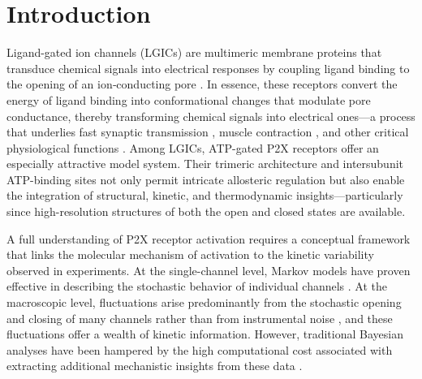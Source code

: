 \documentclass[pdflatex,sn-nature]{sn-jnl}%
\theoremstyle{thmstyleone}%
\theoremstyle{thmstyletwo}%
\theoremstyle{thmstylethree}%
\begin{document}

\maketitle
\section{Introduction}

Ligand-gated ion channels (LGICs) are multimeric membrane proteins that transduce chemical signals into electrical responses by coupling ligand binding to the opening of an ion‐conducting pore \cite{Changeux1984AcetylcholineRA,UNWIN199331, Lemoine2012,galligan2002ligand,feske2012ion}. In essence, these receptors convert the energy of ligand binding into conformational changes that modulate pore conductance, thereby transforming chemical signals into electrical ones—a process that underlies fast synaptic transmission \cite{nakanishi1994metabotropic,greengard2001neurobiology}, muscle contraction \cite{peper1982acetylcholine}, and other critical physiological functions \cite{burnstock2007physiology}. Among LGICs, ATP-gated P2X receptors offer an especially attractive model system. Their trimeric architecture \cite{trimer} and intersubunit ATP-binding sites \cite{MarquezKlaka2007IdentificationOA} not only permit intricate allosteric regulation but also enable the integration of structural, kinetic, and thermodynamic insights—particularly since high-resolution structures of both the open \cite{abierta_p2x} and closed \cite{cerrada_p2x} states are available.

A full understanding of P2X receptor activation requires a conceptual framework that links the molecular mechanism of activation to the kinetic variability observed in experiments. At the single-channel level, Markov models have proven effective in describing the stochastic behavior of individual channels \cite{properties_single_channe}. At the macroscopic level, fluctuations arise predominantly from the stochastic opening and closing of many channels rather than from instrumental noise \cite{Moffatt_hume}, and these fluctuations offer a wealth of kinetic information. However, traditional Bayesian analyses have been hampered by the high computational cost associated with extracting additional mechanistic insights from these data \cite{Moffatt}.
\end{document}
